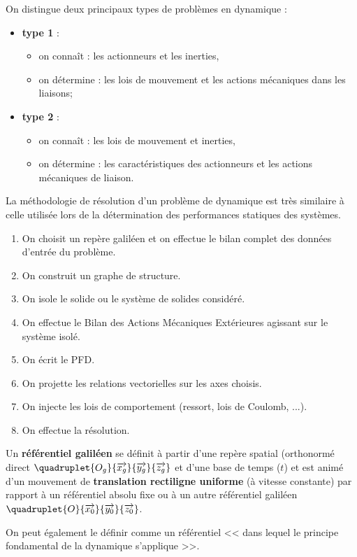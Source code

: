 On distingue deux principaux types de problèmes en dynamique : 
\begin{itemize}
\item \textbf{type 1} :
\begin{itemize}
\item on connaît : les actionneurs et les inerties,
\item on détermine : les lois de mouvement et les actions mécaniques dans les liaisons;
\end{itemize} 
\item \textbf{type 2} :
\begin{itemize}
\item on connaît : les lois de mouvement et inerties,
\item on détermine : les caractéristiques des actionneurs et les actions mécaniques de liaison.
\end{itemize}
\end{itemize}

La méthodologie de résolution d'un problème de dynamique est très similaire à celle utilisée lors de la détermination des performances statiques des systèmes.

\begin{enumerate}
\item On choisit un repère galiléen et on effectue le bilan complet des données d'entrée du problème.
\item On construit un graphe de structure.
\item On isole le solide ou le système de solides considéré.
\item On effectue le Bilan des Actions Mécaniques Extérieures agissant sur le système isolé.
\item On écrit le PFD.
\item On projette les relations vectorielles sur les axes choisis.
\item On injecte les lois de comportement (ressort, lois de Coulomb, ...).
\item On effectue la résolution.
\end{enumerate}





\begin{definition}
Un \textbf{référentiel galiléen} se définit à partir d'une repère spatial (orthonormé direct $\quadruplet{O_g}{\overrightarrow{x_g}}{\overrightarrow{y_g}}{\overrightarrow{z_g}}$ et d'une base de temps ($t$) et est animé d'un mouvement de \textbf{translation rectiligne uniforme} (à vitesse constante) par rapport à un référentiel absolu fixe ou à un autre référentiel galiléen $\quadruplet{O}{\overrightarrow{x_0}}{\overrightarrow{y_0}}{\overrightarrow{z_0}}$. 

On peut également le définir comme un référentiel << dans lequel le principe fondamental de la dynamique s'applique >>.
\end{definition}

